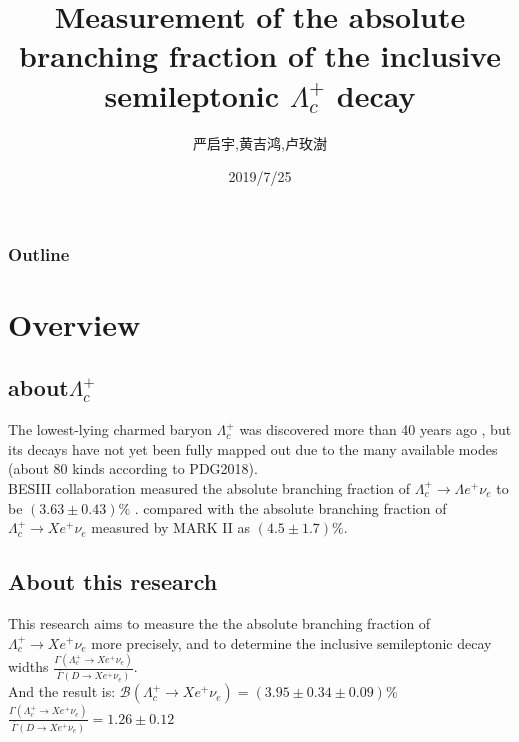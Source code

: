 \documentclass{beamer}
\title{Measurement of the absolute branching fraction of the inclusive semileptonic $\Lambda_c^+$ decay}
\author{严启宇,黄吉鸿,卢玫澍}
\institute{UCAS}
\date{2019/7/25}
\begin{document}

\begin{frame}
    \titlepage
\end{frame}

\begin{frame}
    \frametitle{Outline}
    \tableofcontents
\end{frame}

\section{Overview}
\subsection{about$\Lambda_c^+$}
\begin{frame}
    \sectionpage
\end{frame}

\begin{frame}
    The lowest-lying charmed baryon $\Lambda_c^+$ was discovered more than 40 years ago\cite{knapp1976observation}\cite{abrams1980observation} , but its
    decays have not yet been fully mapped out due to the many available modes (about 80 kinds according to PDG2018). \\ 
    \vspace{0.2in}
    BESIII collaboration measured the absolute branching fraction of $\Lambda_c^+ \rightarrow \Lambda e^+ \nu_e$ to be $(3.63 \pm 0.43)\%$ \cite{ablikim2015measurement}.
    compared with the absolute branching fraction of $\Lambda_c^+ \rightarrow X e^+ \nu_e$ measured by MARK II as $(4.5 \pm 1.7)\%$.\cite{vella1982observation}

\end{frame}
\subsection{About this research}
\begin{frame}
    This research \cite{ablikim2018measurement} aims to measure the the absolute branching fraction of $\Lambda_c^+ \rightarrow X e^+ \nu_e$ more precisely, and to determine 
    the inclusive semileptonic decay widths $\frac{\Gamma(\Lambda_c^+ \rightarrow X e^+ \nu_e)}{\bar{\Gamma}(D\rightarrow X e^+ \nu_e)}$.\\
    \vspace{0.2in}
    And the result is: $\mathcal{B}(\Lambda_c^+ \rightarrow X e^+ \nu_e) = (3.95\pm0.34\pm0.09)\%$ \\ $\frac{\Gamma(\Lambda_c^+ \rightarrow X e^+ \nu_e)}{\bar{\Gamma}(D\rightarrow X e^+ \nu_e)}=1.26\pm0.12$
\end{frame}
\end{document}
